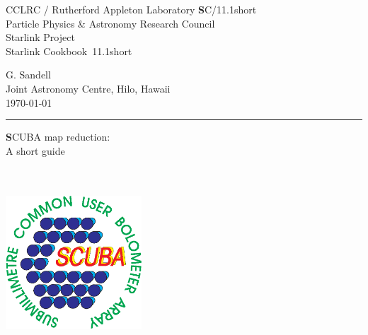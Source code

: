 \documentclass[twoside,11pt]{article}
\newcommand{\stardoccategory}  {Starlink Cookbook}
\newcommand{\stardocinitials}  {SC}
\newcommand{\stardocnumber}    {11.1short}
\newcommand{\stardocauthors}   {G. Sandell \\ \jac}
\newcommand{\stardocdate}      {\today}
\newcommand{\stardoctitle}     {SCUBA map reduction:\\[2ex]
                                A short guide}
\newcommand{\stardocversion}   {\ }
\newcommand{\stardocmanual}    {\ }
\newcommand{\jac}{\htmladdnormallink{Joint Astronomy Centre}{http://www.jach.hawaii.edu},
 Hilo, Hawaii}
\newcommand{\stardocname}{\stardocinitials /\stardocnumber}
\newcommand{\htmladdnormallink}[2]{#1}
\newenvironment{latexonly}{}{}
\renewcommand{\_}{\texttt{\symbol{95}}}
\begin{document}
\thispagestyle{empty}

\begin{latexonly}
   CCLRC / {\textsc Rutherford Appleton Laboratory} \hfill {\textbf \stardocname}\\
   {\large Particle Physics \& Astronomy Research Council}\\
   {\large Starlink Project\\}
   {\large \stardoccategory\ \stardocnumber}
   \begin{flushright}
   \stardocauthors\\
   \stardocdate
   \end{flushright}
   \vspace{-4mm}
   \rule{\textwidth}{0.5mm}
   \vspace{5mm}
   \begin{center}
   {\Huge\textbf  \stardoctitle \\ [2.5ex]}
   {\LARGE\textbf \stardocversion \\ [4ex]}
   {\Huge\textbf  \stardocmanual}
   \end{center}

\begin{center}
\includegraphics[width=2.0in]{sc11_logo.eps}
\end{center}

\end{latexonly}
\end{document}
